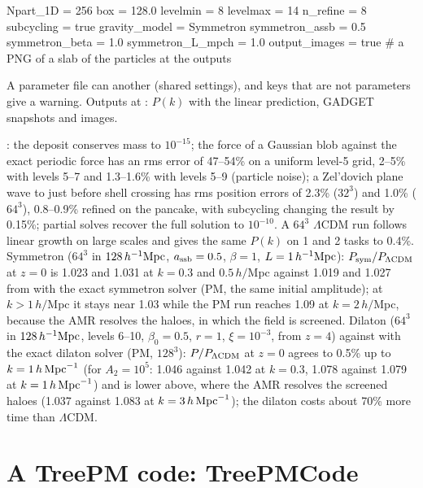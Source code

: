 \begin{paramfile}[AMRCode: symmetron (the parameter file is \code{key = value})]
Npart_1D   = 256
box        = 128.0
levelmin   = 8
levelmax   = 14
n_refine   = 8
subcycling = true
gravity_model    = Symmetron
symmetron_assb   = 0.5
symmetron_beta   = 1.0
symmetron_L_mpch = 1.0
output_images    = true     # a PNG of a slab of the particles at the outputs
\end{paramfile}
A parameter file can  another (shared settings), and keys that are not parameters give a warning.
Outputs at : $P(k)$ with the linear prediction, GADGET snapshots and images.

\begin{validation}
: the deposit conserves mass to $10^{-15}$; the force of a Gaussian blob against the exact periodic
force has an rms error of 47--54\% on a uniform level-5 grid, 2--5\% with levels 5--7 and 1.3--1.6\% with levels 5--9
(particle noise); a Zel'dovich plane wave to just before shell crossing has rms position errors of 2.3\% ($32^3$) and
1.0\% ($64^3$), 0.8--0.9\% refined on the pancake, with subcycling changing the result by 0.15\%; partial solves recover
the full solution to $10^{-10}$. A $64^3$ $\Lambda$CDM run follows linear growth on large scales and gives the same
$P(k)$ on 1 and 2 tasks to 0.4\%. Symmetron ($64^3$ in $128\,h^{-1}\mathrm{Mpc}$, $a_{\rm ssb}=0.5$, $\beta=1$, $L=1\,h^{-1}\mathrm{Mpc}$):
$P_{\rm sym}/P_{\Lambda\rm CDM}$ at $z=0$ is 1.023 and 1.031 at $k=0.3$ and $0.5\,h/$Mpc against 1.019 and 1.027 from
 with the exact symmetron solver (PM, the same initial amplitude); at $k>1\,h/$Mpc it stays near 1.03
while the PM run reaches 1.09 at $k=2\,h/$Mpc, because the AMR resolves the haloes, in which the field is screened.
Dilaton ($64^3$ in $128\,h^{-1}\mathrm{Mpc}$, levels 6--10, $\beta_0=0.5$, $r=1$, $\xi=10^{-3}$, from $z=4$) against  with the
exact dilaton solver (PM, $128^3$): $P/P_{\Lambda\rm CDM}$ at $z=0$ agrees to 0.5\% up to $k=1\,h\,\mathrm{Mpc}^{-1}$ (for $A_2=10^5$: 1.046 against
1.042 at $k=0.3$, 1.078 against 1.079 at $k=1\,h\,\mathrm{Mpc}^{-1}$) and is lower above, where the AMR resolves the screened haloes (1.037 against
1.083 at $k=3\,h\,\mathrm{Mpc}^{-1}$); the dilaton costs about 70\% more time than $\Lambda$CDM.
\end{validation}

\section{A TreePM code: TreePMCode}\label{sec:sr-treepm}

